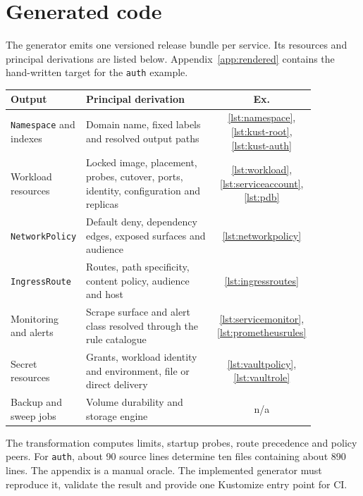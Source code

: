 \section{Generated code}

The generator emits one versioned release bundle per service. Its resources and
principal derivations are listed below. Appendix~\ref{app:rendered} contains the
hand-written target for the \texttt{auth} example.

{\footnotesize
\setlength{\tabcolsep}{5pt}
\renewcommand{\arraystretch}{1.25}
\noindent\begin{tabular}{@{}p{0.23\linewidth}p{0.635\linewidth}c@{}}
\hline
\textbf{Output} & \textbf{Principal derivation} & \textbf{Ex.} \\
\hline
\texttt{Namespace} and indexes &
  Domain name, fixed labels and resolved output paths &
  \ref{lst:namespace}, \ref{lst:kust-root}, \ref{lst:kust-auth} \\
Workload resources &
  Locked image, placement, probes, cutover, ports, identity, configuration and replicas &
  \ref{lst:workload}, \ref{lst:serviceaccount}, \ref{lst:pdb} \\
\texttt{NetworkPolicy} &
  Default deny, dependency edges, exposed surfaces and audience &
  \ref{lst:networkpolicy} \\
\texttt{IngressRoute} &
  Routes, path specificity, content policy, audience and host &
  \ref{lst:ingressroutes} \\
Monitoring and alerts &
  Scrape surface and alert class resolved through the rule catalogue &
  \ref{lst:servicemonitor}, \ref{lst:prometheusrules} \\
Secret resources &
  Grants, workload identity and environment, file or direct delivery &
  \ref{lst:vaultpolicy}, \ref{lst:vaultrole} \\
Backup and sweep jobs &
  Volume durability and storage engine & n/a \\
\hline
\end{tabular}}

The transformation computes limits, startup probes, route precedence and policy
peers. For \texttt{auth}, about 90 source lines determine ten files containing
about 890 lines. The appendix is a manual oracle. The implemented generator must
reproduce it, validate the result and provide one Kustomize entry point for CI.
